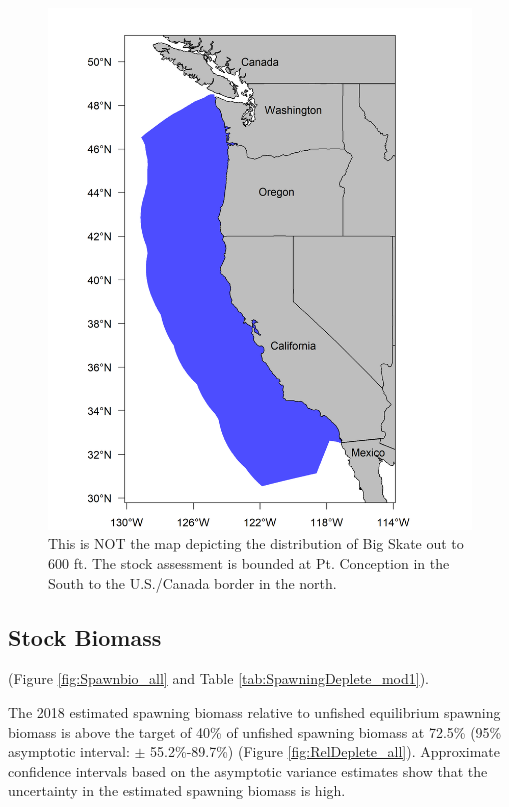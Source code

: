 \documentclass[12pt,]{article}
\begin{document}
\begin{figure}
\centering
\includegraphics{Figures/assess_region_map.png}
\caption{This is NOT the map depicting the distribution of Big Skate out
to 600 ft. The stock assessment is bounded at Pt. Conception in the
South to the U.S./Canada border in the north.
\label{fig:assess_region_map}}
\end{figure}

\FloatBarrier

\hypertarget{stock-biomass}{%
\subsection*{Stock Biomass}\label{stock-biomass}}

(Figure \ref{fig:Spawnbio_all} and Table
\ref{tab:SpawningDeplete_mod1}).

The 2018 estimated spawning biomass relative to unfished equilibrium
spawning biomass is above the target of 40\% of unfished spawning
biomass at 72.5\% (95\% asymptotic interval: \(\pm\) 55.2\%-89.7\%)
(Figure \ref{fig:RelDeplete_all}). Approximate confidence intervals
based on the asymptotic variance estimates show that the uncertainty in
the estimated spawning biomass is high.
\end{document}
